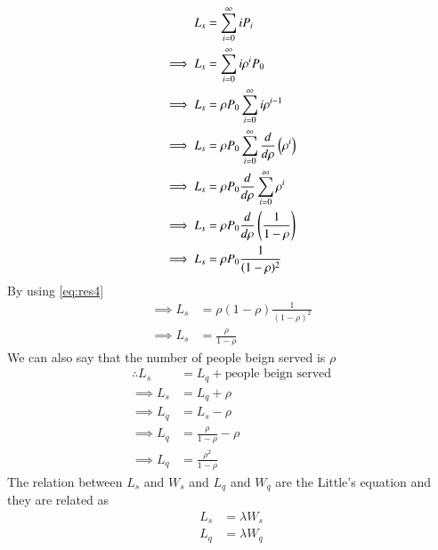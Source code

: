 \documentclass[journal,12pt,twocolumn]{IEEEtran}
\begin{document}
\begin{itemize}
\begin{align}
    L_s&=\sum_{i=0}^{\infty}iP_i\\
    \implies L_s&=\sum_{i=0}^{\infty}i\rho^iP_0\\
    \implies L_s&=\rho P_0\sum_{i=0}^{\infty}i\rho^{i-1}\\
    \implies L_s&=\rho P_0\sum_{i=0}^{\infty}\frac{d}{d\rho}\left(\rho^i\right)\\
    \implies L_s&=\rho P_0\frac{d}{d\rho}\sum_{i=0}^{\infty}\rho^i\\
    \implies L_s&=\rho P_0\frac{d}{d\rho}\left(\frac{1}{1-\rho}\right)\\
    \implies L_s&=\rho P_0\frac{1}{(1-\rho)^2}
\end{align}
By using \eqref{eq:res4}
\begin{align}
    \implies L_s&=\rho(1-\rho)\frac{1}{(1-\rho)^2}\\
    \implies L_s&=\frac{\rho}{1-\rho}
\end{align}
We can also say that the number of people beign served is $\rho$
\begin{align}
    \therefore L_s&=L_q+\text{people beign served}\\
    \implies L_s&=L_q+\rho\\
    \implies L_q&=L_s-\rho\\
    \implies L_q&=\frac{\rho}{1-\rho}-\rho\\
    \implies L_q&=\frac{\rho^2}{1-\rho}
\end{align}
\newpage
The relation between $L_s$ and $W_s$ and $L_q$ and $W_q$ are the Little's equation and they are related as
\begin{align}
    L_s&=\lambda W_s\\
    L_q&=\lambda W_q
\end{align}
\end{itemize}
\end{document}
